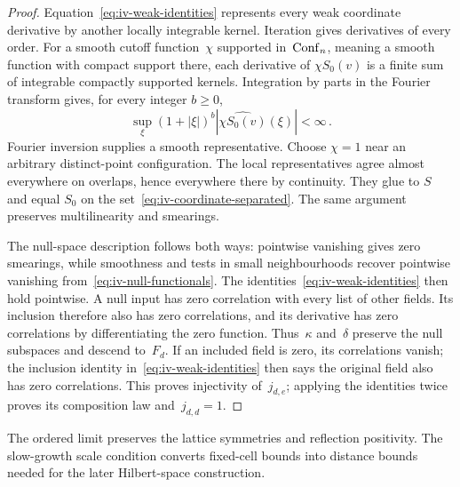 \begin{proof}
Equation~\eqref{eq:iv-weak-identities} represents every weak coordinate derivative by another locally integrable kernel.
Iteration gives derivatives of every order.
For a smooth cutoff function~$\chi$ supported in~$\operatorname{Conf}_{n}$, meaning a smooth function with compact support there, each derivative of $\chi S_0(v)$ is a finite sum of integrable compactly supported kernels.
Integration by parts in the Fourier transform gives, for every integer $b\ge0$,
\begin{equation*}
\sup_\xi(1+|\xi|)^b\left|\widehat{\chi S_0(v)}(\xi)\right|<\infty\,.
\end{equation*}
Fourier inversion supplies a smooth representative.
Choose $\chi=1$ near an arbitrary distinct-point configuration.
The local representatives agree almost everywhere on overlaps, hence everywhere there by continuity.
They glue to $S$ and equal $S_0$ on the set~\eqref{eq:iv-coordinate-separated}.
The same argument preserves multilinearity and smearings.

The null-space description follows both ways: pointwise vanishing gives zero smearings, while smoothness and tests in small neighbourhoods recover pointwise vanishing from~\eqref{eq:iv-null-functionals}.
The identities~\eqref{eq:iv-weak-identities} then hold pointwise.
A null input has zero correlation with every list of other fields. Its inclusion therefore also has zero correlations, and its derivative has zero correlations by differentiating the zero function. Thus~$\kappa$ and~$\delta$ preserve the null subspaces and descend to~$F_d$.
If an included field is zero, its correlations vanish; the inclusion identity in~\eqref{eq:iv-weak-identities} then says the original field also has zero correlations. This proves injectivity of~$j_{d,e}$; applying the identities twice proves its composition law and~$j_{d,d}=1$.
\end{proof}

The ordered limit preserves the lattice symmetries and reflection positivity. The slow-growth scale condition converts fixed-cell bounds into distance bounds needed for the later Hilbert-space construction.

